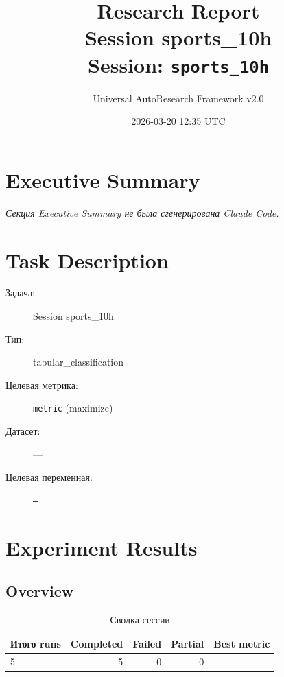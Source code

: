 \documentclass[12pt,a4paper]{article}
\title{
    \Large\textbf{Research Report}\\[0.5em]
    \large Session sports\_10h\\[0.3em]
    \normalsize Session: \texttt{sports\_10h}
}
\author{Universal AutoResearch Framework v2.0}
\date{2026-03-20 12:35 UTC}
\begin{document}
\maketitle
\tableofcontents
\newpage


\section{Executive Summary}

\textit{Секция Executive Summary не была сгенерирована Claude Code.}



\section{Task Description}

\begin{description}
    \item[Задача:] Session sports\_10h
    \item[Тип:] tabular\_classification
    \item[Целевая метрика:] \texttt{metric}
        (maximize)
    \item[Датасет:] ---
    \item[Целевая переменная:] \texttt{---}
\end{description}




\section{Experiment Results}

\subsection{Overview}

\begin{table}[H]
\centering
\caption{Сводка сессии}
\begin{tabular}{lrrrr}
\toprule
Итого runs & Completed & Failed & Partial & Best metric \\
\midrule
5 & \textcolor{passcolor}{5}
    & \textcolor{failcolor}{0}
    & \textcolor{partialcolor}{0}
    & --- \\
\bottomrule
\end{tabular}
\end{table}
\end{document}
